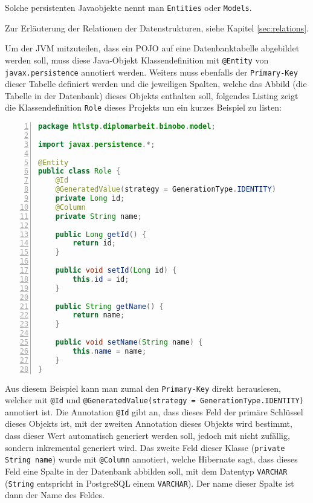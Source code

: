 \documentclass[paper=a4,12pt]{scrreprt}
\begin{document}
Solche persistenten Javaobjekte nennt man \texttt{Entities} oder \texttt{Models}.\newline

Zur Erläuterung der Relationen der Datenstrukturen, siehe Kapitel \ref{sec:relations}.
\newline

Um der JVM mitzuteilen, dass ein POJO auf eine Datenbanktabelle abgebildet werden soll, muss diese Java-Objekt Klassendefinition mit \texttt{@Entity} von \texttt{javax.persistence} annotiert werden.\newline
Weiters muss ebenfalls der \texttt{Primary-Key} dieser Tabelle definiert werden und die jeweiligen Spalten, welche das Abbild (die Tabelle in der Datenbank) dieses Objekts enthalten soll, folgendes Listing zeigt die Klassendefinition
\texttt{Role} dieses Projekts um ein kurzes Beispiel zu listen:\newline

\begin{lstlisting}[caption={Role - Entity}, captionpos=b, label={listing:role_entity}, language=java, numbers=left,
  stepnumber=1]
package htlstp.diplomarbeit.binobo.model;

import javax.persistence.*;

@Entity
public class Role {
    @Id
    @GeneratedValue(strategy = GenerationType.IDENTITY)
    private Long id;
    @Column
    private String name;

    public Long getId() {
        return id;
    }

    public void setId(Long id) {
        this.id = id;
    }

    public String getName() {
        return name;
    }

    public void setName(String name) {
        this.name = name;
    }
}
\end{lstlisting}

Aus diesem Beispiel kann man zumal den \texttt{Primary-Key} direkt herauslesen, welcher mit \texttt{@Id} und \texttt{@GeneratedValue(strategy = GenerationType.IDENTITY)} annotiert ist. Die Annotation \texttt{@Id} gibt an, dass dieses Feld
der primäre Schlüssel dieses Objekts ist, mit der zweiten Annotation dieses Objekts wird bestimmt, dass dieser Wert automatisch generiert werden soll, jedoch mit nicht zufällig, sondern inkremental generiert wird.\newline
Das zweite Feld dieser Klasse (\texttt{private String name}) wurde mit \texttt{@Column} annotiert, welche Hibernate sagt, dass dieses Feld eine Spalte in der Datenbank abbilden soll, mit dem Datentyp \texttt{VARCHAR} (\texttt{String} entspricht in PostgreSQL einem \texttt{VARCHAR}). Der name dieser Spalte ist dann
der Name des Feldes.\newline
\end{document}
